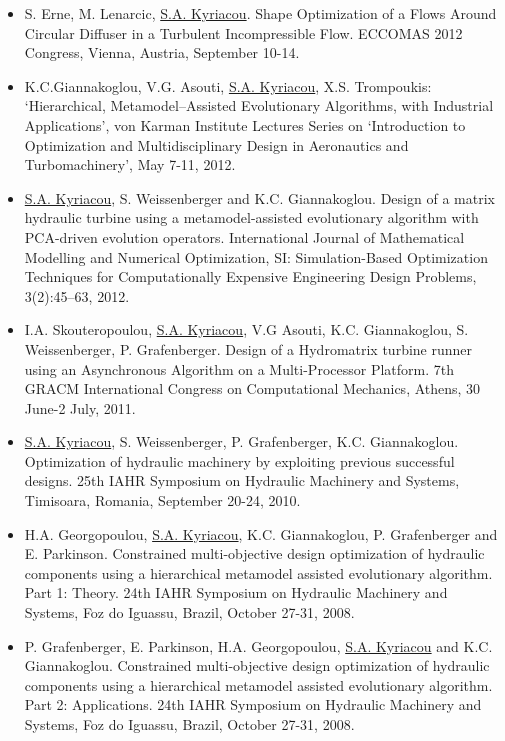 \begin{itemize}

\item[] S. Erne, M. Lenarcic, \underline{S.A. Kyriacou}.
Shape Optimization of a Flows Around Circular Diffuser in a Turbulent Incompressible Flow. ECCOMAS 2012 Congress,
Vienna, Austria, September 10-14.


\item[] K.C.Giannakoglou, V.G. Asouti, \underline{S.A. Kyriacou}, X.S. Trompoukis: ‘Hierarchical, Metamodel–Assisted Evolutionary Algorithms, with
Industrial Applications’, von Karman Institute Lectures Series on ‘Introduction to Optimization and Multidisciplinary Design in
Aeronautics and Turbomachinery’, May 7-11, 2012.


\item[] \underline{S.A. Kyriacou}, S. Weissenberger and K.C. Giannakoglou.
Design of a matrix hydraulic turbine using a metamodel-assisted evolutionary algorithm with PCA-driven evolution
operators. International Journal of Mathematical Modelling and Numerical Optimization, SI: Simulation-Based
Optimization Techniques for Computationally Expensive Engineering Design Problems, 3(2):45–63, 2012.


\item[] I.A. Skouteropoulou, \underline{S.A. Kyriacou}, V.G Asouti, K.C. Giannakoglou, S. Weissenberger, P. Grafenberger.
Design of a Hydromatrix turbine runner using an Asynchronous Algorithm on a Multi-Processor Platform. 7th GRACM
International Congress on Computational Mechanics, Athens, 30 June-2 July, 2011.


\item[] \underline{S.A. Kyriacou}, S. Weissenberger, P. Grafenberger, K.C. Giannakoglou.
Optimization of hydraulic machinery by exploiting previous successful designs. 25th IAHR Symposium on Hydraulic
Machinery and Systems, Timisoara, Romania, September 20-24, 2010.


\item[] H.A. Georgopoulou, \underline{S.A. Kyriacou}, K.C. Giannakoglou, P. Grafenberger and E. Parkinson.
Constrained multi-objective design optimization of hydraulic components using a hierarchical metamodel assisted
evolutionary algorithm. Part 1: Theory. 24th IAHR Symposium on Hydraulic Machinery and Systems, Foz do Iguassu,
Brazil, October 27-31, 2008.


\item[] P. Grafenberger, E. Parkinson, H.A. Georgopoulou, \underline{S.A. Kyriacou} and K.C. Giannakoglou.
Constrained multi-objective design optimization of hydraulic components using a hierarchical metamodel assisted
evolutionary algorithm. Part 2: Applications. 24th IAHR Symposium on Hydraulic Machinery and Systems, Foz do
Iguassu, Brazil, October 27-31, 2008.


\end{itemize}
